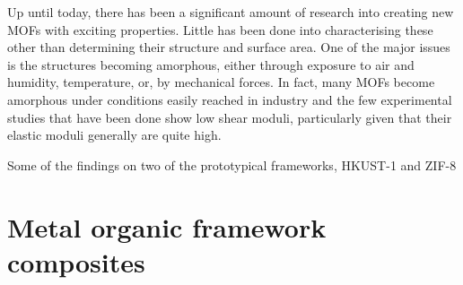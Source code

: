 Up until today, there has been a significant amount of research into creating new MOFs with exciting properties. Little has been done into characterising these other than determining their structure and surface area. One of the major issues is the structures becoming amorphous, either through exposure to air and humidity, temperature, or, by mechanical forces. In fact, many MOFs become amorphous under conditions easily reached in industry and the few experimental studies that have been done show low shear moduli, particularly given that their elastic moduli generally are quite high.

Some of the findings on two of the prototypical frameworks, HKUST-1 and ZIF-8

\section{Metal organic framework composites}